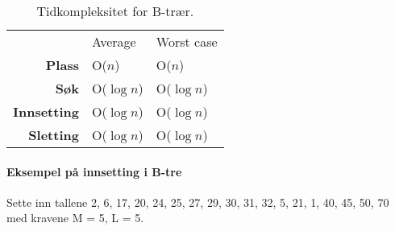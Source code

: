 \documentclass[11pt,a4paper]{article}
\theoremstyle{def}
\begin{document}
\begin{table}[h!]
\centering
\begin{tabular}{rll}
&Average&Worst case\\
\textbf{Plass} & O($n$) & O($n$)\\
\textbf{Søk} & O($\log n$) & O($\log n$)\\
\textbf{Innsetting} & O($\log n$) & O($\log n$)\\
\textbf{Sletting} & O($\log n$) & O($\log n$)\\
\end{tabular}
\label{tab:obst}
\caption{Tidkompleksitet for B-trær.}
\end{table}

\newpage

\paragraph{Eksempel på innsetting i B-tre} Sette inn tallene 2, 6, 17, 20, 24, 25, 27, 29, 30, 31, 32, 5, 21, 1, 40, 45, 50, 70 med kravene M = 5, L = 5.
\end{document}
